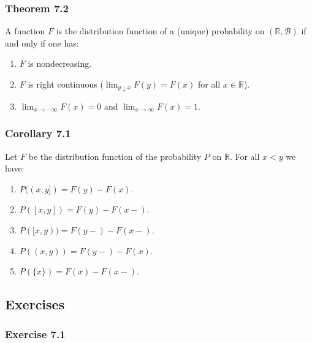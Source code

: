 \documentclass{article}
\begin{document}
{\subsubsection*{Theorem 7.2}

A function $F$ is the distribution function of a (unique) probability on $(\mathbb{R}, \mathcal{B})$ if and only if one has:

\begin{enumerate}
\item

$F$ is nondecreasing. 

\item

$F$ is right continuous ($\lim_{y\downarrow x} F(y) = F(x)$ for all $x \in \mathbb{R}$).

\item

$\lim_{x\rightarrow -\infty} F(x) = 0$ and $\lim_{x\rightarrow \infty} F(x) = 1$. 
\end{enumerate}

\subsubsection*{Corollary 7.1}

Let $F$ be the distribution function of the probability $P$  on $\mathbb{R}$. For all $x<y$ we have:

\begin{enumerate}
\item $P((x,y]) = F(y) - F(x)$.

\item $P([x,y]) = F(y) - F(x-)$.

\item $P([x,y)) = F(y-) - F(x-)$.

\item $P((x,y)) = F(y-) - F(x)$.

\item $P(\{x\}) = F(x) - F(x-)$. 

\end{enumerate}

\subsection*{Exercises}

\subsubsection*{Exercise 7.1}

}
\end{document}
